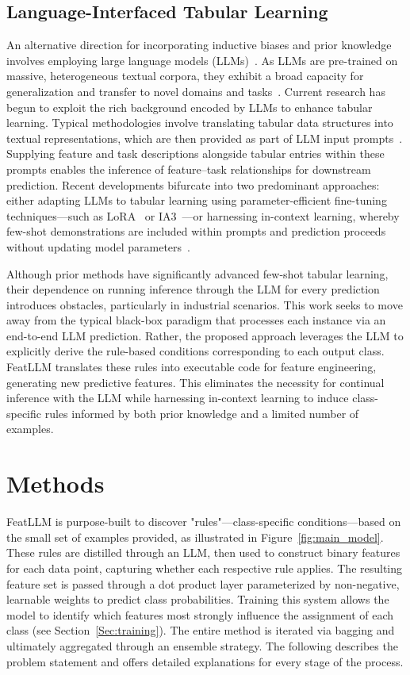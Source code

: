 \subsection{Language-Interfaced Tabular Learning} An alternative direction for incorporating inductive biases and prior knowledge involves employing large language models (LLMs)~\cite{anil2023palm,openai2023gpt4}. As LLMs are pre-trained on massive, heterogeneous textual corpora, they exhibit a broad capacity for generalization and transfer to novel domains and tasks~\cite{brown2020language}. Current research has begun to exploit the rich background encoded by LLMs to enhance tabular learning. Typical methodologies involve translating tabular data structures into textual representations, which are then provided as part of LLM input prompts~\cite{dinh2022lift,hegselmann2023tabllm,wang2023anypredict}. Supplying feature and task descriptions alongside tabular entries within these prompts enables the inference of feature–task relationships for downstream prediction. Recent developments bifurcate into two predominant approaches: either adapting LLMs to tabular learning using parameter-efficient fine-tuning techniques—such as LoRA~\cite{hu2021lora} or IA3~\cite{liu2022few}—or harnessing in-context learning, whereby few-shot demonstrations are included within prompts and prediction proceeds without updating model parameters~\cite{dinh2022lift,hegselmann2023tabllm,nam2023semi,slack2023tablet}.

Although prior methods have significantly advanced few-shot tabular learning, their dependence on running inference through the LLM for every prediction introduces obstacles, particularly in industrial scenarios. This work seeks to move away from the typical black-box paradigm that processes each instance via an end-to-end LLM prediction. Rather, the proposed approach leverages the LLM to explicitly derive the rule-based conditions corresponding to each output class. \textsf{FeatLLM} translates these rules into executable code for feature engineering, generating new predictive features. This eliminates the necessity for continual inference with the LLM while harnessing in-context learning to induce class-specific rules informed by both prior knowledge and a limited number of examples.

\section{Methods}
\textsf{FeatLLM} is purpose-built to discover "rules"—class-specific conditions—based on the small set of examples provided, as illustrated in Figure~\ref{fig:main_model}. These rules are distilled through an LLM, then used to construct binary features for each data point, capturing whether each respective rule applies. The resulting feature set is passed through a dot product layer parameterized by non-negative, learnable weights to predict class probabilities. Training this system allows the model to identify which features most strongly influence the assignment of each class (see Section~\ref{Sec:training}). The entire method is iterated via bagging and ultimately aggregated through an ensemble strategy. The following describes the problem statement and offers detailed explanations for every stage of the process.

